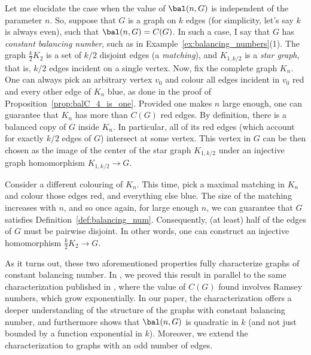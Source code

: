 Let me elucidate the case when the value of $\bal(n,G)$ is independent of the parameter $n$.
So, suppose that $G$ is a graph on $k$ edges (for simplicity, let's say $k$ is always even), such that $\bal(n,G)=C(G)$.
In such a case, I say that $G$ has \emph{constant balancing number}, such as in Example~\ref{ex:balancing_numbers}(1).
The graph $\frac k2K_2$ is a set of $k/2$ disjoint edges (a \emph{matching}), and $K_{1,k/2}$ is a \emph{star graph}, that is, $k/2$ edges incident on a single vertex.
Now, fix the complete graph $K_n$.
One can always pick an arbitrary vertex $v_0$ and colour all edges incident in $v_0$ red and every other edge of $K_n$ blue, as done in the proof of Proposition~\ref{prop:balC_4_is_one}.
Provided one makes $n$ large enough, one can guarantee that $K_n$ has more than $C(G)$ red edges.
By definition, there is a balanced copy of $G$ inside $K_n$.
In particular, all of its red edges (which account for exactly $k/2$ edges of $G$) intersect at some vertex.
This vertex in $G$ can be then chosen as the image of the center of the star graph $K_{1,k/2}$ under an injective graph homomorphism $K_{1,k/2}\to G$.

Consider a different colouring of $K_n$.
This time, pick a maximal matching in $K_n$ and colour those edges red, and everything else blue.
The size of the matching increases with $n$, and so once again, for large enough $n$, we can guarantee that $G$ satisfies Definition~\ref{def:balancing_num}.
Consequently, (at least) half of the edges of $G$ must be pairwise disjoint.
In other words, one can construct an injective homomorphism $\frac k2K_2\to G$.

As it turns out, these two aforementioned properties fully characterize graphs of constant balancing number.
In \cite{Caroetal2023}, we proved this result in parallel to the same characterization published in \cite[Section~3.2]{caro2022evolution}, where the value of $C(G)$ found involves Ramsey numbers, which grow exponentially.
In our paper, the characterization offers a deeper understanding of the structure of the graphs with constant balancing number, and furthermore shows that $\bal(n,G)$ is quadratic in $k$ (and not just bounded by a function exponential in $k$).
Moreover, we extend the characterization to graphs with an odd number of edges.

